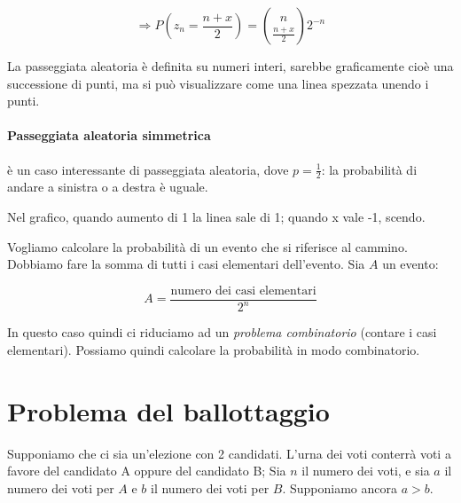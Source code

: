 \documentclass[a4paper,12pt]{book}
\begin{document}
$$\Rightarrow P(z_n = \frac{n+x}{2}) = \binom{n}{\frac{n+x}{2}}2^{-n}$$

La passeggiata aleatoria è definita su numeri interi, sarebbe graficamente cioè una successione di punti, ma si può visualizzare come una linea spezzata unendo i punti. 

\paragraph{Passeggiata aleatoria simmetrica} è un caso interessante di passeggiata aleatoria, dove $ p = \frac{1}{2} $: la probabilità di andare a sinistra o a destra è uguale. 

Nel grafico, quando aumento di 1 la linea sale di 1; quando x vale -1, scendo. 


Vogliamo calcolare la probabilità di un evento che si riferisce al cammino. Dobbiamo fare la somma di tutti i casi elementari dell'evento. Sia $ A $ un evento:

$$A = \frac{\text{numero dei casi elementari}}{2^n}$$

In questo caso quindi ci riduciamo ad un \textit{problema combinatorio} (contare i casi elementari). Possiamo quindi calcolare la probabilità in modo combinatorio. 

\section{Problema del ballottaggio}
Supponiamo che ci sia un'elezione con 2 candidati. L'urna dei voti conterrà voti a favore del candidato A oppure del candidato B; Sia $ n $ il numero dei voti, e sia $ a $ il numero dei voti per $ A $ e $ b $ il numero dei voti per $ B $.  Supponiamo ancora $ a > b $. 
\end{document}
